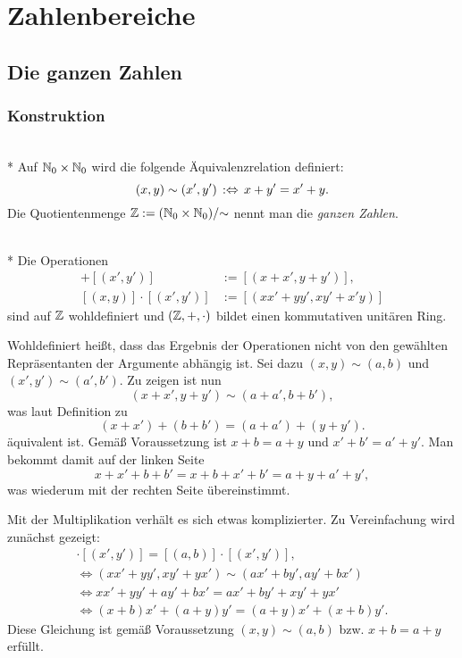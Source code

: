
\chapter{Zahlenbereiche}

\section{Die ganzen Zahlen}

\subsection{Konstruktion}

\begin{Definition}\mbox{}\\*
Auf $\mathbb N_0\times\mathbb N_0$ wird die folgende Äquivalenzrelation definiert:
\[(x,y)\sim (x',y')\,:\Leftrightarrow\, x+y' = x'+y.\]
Die Quotientenmenge $\mathbb Z := (\mathbb N_0\times\mathbb N_0)/{\sim}$ nennt man
die \emph{ganzen Zahlen}.
\end{Definition}

\begin{Satz}\mbox{}\\*
Die Operationen
\begin{align*}
[(x,y)]+[(x',y')] &:= [(x+x',y+y')],\\
[(x,y)]\cdot [(x',y')] &:= [(xx'+yy',xy'+x'y)]
\end{align*}
sind auf $\mathbb Z$ wohldefiniert und $(\mathbb Z,+,\cdot)$ bildet einen
kommutativen unitären Ring.
\end{Satz}
 Wohldefiniert heißt, dass das Ergebnis der Operationen
nicht von den gewählten Repräsentanten der Argumente abhängig ist.
Sei dazu $(x,y)\sim(a,b)$ und
$(x',y')\sim (a',b')$. Zu zeigen ist nun
\[(x+x',y+y')\sim (a+a',b+b'),\]
was laut Definition zu
\[(x+x')+(b+b') = (a+a')+(y+y').\]
äquivalent ist. Gemäß Voraussetzung ist $x+b=a+y$ und $x'+b'=a'+y'$.
Man bekommt damit auf der linken Seite
\[x+x'+b+b' = x+b+x'+b' = a+y+a'+y',\]
was wiederum mit der rechten Seite übereinstimmt.

Mit der Multiplikation verhält es sich etwas komplizierter.
Zu Vereinfachung wird zunächst gezeigt:
\begin{gather*}
[(x,y)]\cdot [(x',y')] = [(a,b)]\cdot [(x',y')],\\
\iff (xx'+yy',xy'+yx')\sim (ax'+by',ay'+bx')\\
\iff xx'+yy' + ay'+bx' = ax'+by' + xy'+yx'\\
\iff (x+b)x' + (a+y)y' = (a+y)x' + (x+b)y'.
\end{gather*}
Diese Gleichung ist gemäß Voraussetzung $(x,y)\sim (a,b)$
bzw. $x+b=a+y$ erfüllt.

